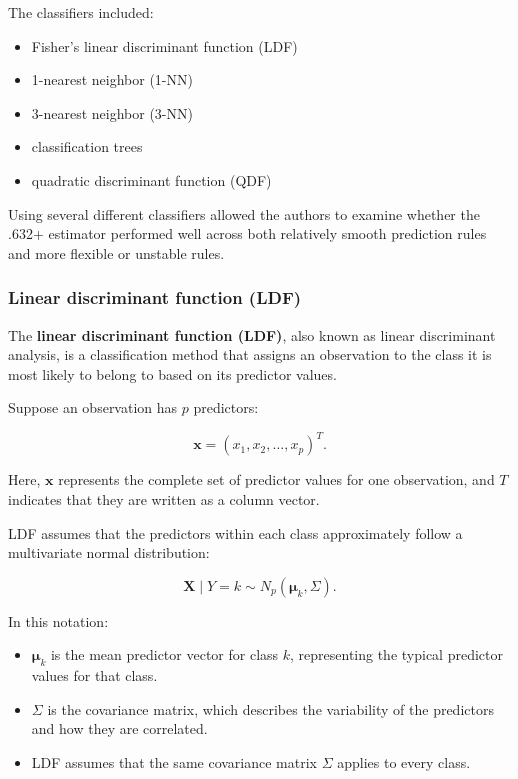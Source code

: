 \documentclass[
  letterpaper,
  DIV=11,
  numbers=noendperiod]{scrreprt}
\providecommand{\tightlist}{%
  \setlength{\itemsep}{0pt}\setlength{\parskip}{0pt}}
\begin{document}
The classifiers included:

\begin{itemize}
\tightlist
\item
  Fisher's linear discriminant function (LDF)
\item
  1-nearest neighbor (1-NN)
\item
  3-nearest neighbor (3-NN)
\item
  classification trees
\item
  quadratic discriminant function (QDF)
\end{itemize}

Using several different classifiers allowed the authors to examine
whether the .632+ estimator performed well across both relatively smooth
prediction rules and more flexible or unstable rules.

\subsubsection{Linear discriminant function
(LDF)}\label{linear-discriminant-function-ldf}

The \textbf{linear discriminant function (LDF)}, also known as linear
discriminant analysis, is a classification method that assigns an
observation to the class it is most likely to belong to based on its
predictor values.

Suppose an observation has \(p\) predictors:

\[
\mathbf{x}=(x_1,x_2,\ldots,x_p)^T.
\]

Here, \(\mathbf{x}\) represents the complete set of predictor values for
one observation, and \(T\) indicates that they are written as a column
vector.

LDF assumes that the predictors within each class approximately follow a
multivariate normal distribution:

\[
\mathbf{X}\mid Y=k
\sim
N_p(\boldsymbol{\mu}_k,\Sigma).
\]

In this notation:

\begin{itemize}
\tightlist
\item
  \(\boldsymbol{\mu}_k\) is the mean predictor vector for class \(k\),
  representing the typical predictor values for that class.
\item
  \(\Sigma\) is the covariance matrix, which describes the variability
  of the predictors and how they are correlated.
\item
  LDF assumes that the same covariance matrix \(\Sigma\) applies to
  every class.
\end{itemize}
\end{document}
